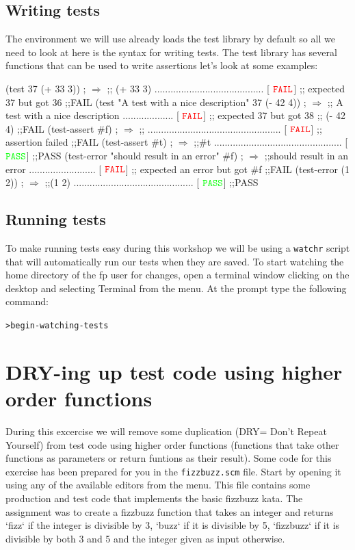 \documentclass[12pt,a4paper,english,twoside]{article}
\begin{document}
\subsection{Writing tests}
The environment we will use already loads the test library by default so all 
we need to look at here is the syntax for writing tests. The test library 
has several functions that can be used to write assertions let's look at some 
examples:
\begin{schemecode}
(test 37  (+ 33 3)) ; $\Rightarrow$ 
;; (+ 33 3) ......................................... [ ${\color{red}\texttt{FAIL}}$]
;;    expected 37 but got 36
;;FAIL
(test "A test with a nice description" 37 (- 42 4)) ; $\Rightarrow$
;; A test with a nice description ................... [ ${\color{red}\texttt{FAIL}}$]
;;    expected 37 but got 38
;;    (- 42 4)
;;FAIL
(test-assert #f) ; $\Rightarrow$
;; .................................................. [ ${\color{red}\texttt{FAIL}}$]
;;    assertion failed
;;FAIL
(test-assert #t) ; $\Rightarrow$
;;#t ................................................ [ ${\color{green}\texttt{PASS}}$]
;;PASS
(test-error "should result in an error" #f) ; $\Rightarrow$
;;should result in an error ......................... [ ${\color{red}\texttt{FAIL}}$]
;;    expected an error but got #f
;;FAIL
(test-error (1 2)) ; $\Rightarrow$
;;(1 2) ............................................. [ ${\color{green}\texttt{PASS}}$]
;;PASS
\end{schemecode}
\subsection{Running tests}
To make running tests easy during this workshop we will be using a 
\texttt{watchr} script that will automatically run our tests when they are 
saved. To start watching the home directory of the fp user for changes, open a 
terminal window clicking on the desktop and selecting Terminal from the menu. 
At the prompt type the following command:
\begin{alltt}
> begin-watching-tests
\end{alltt}
\section{DRY-ing up test code using higher order functions}
During this excercise we will remove some duplication (DRY= Don't Repeat 
Yourself) from test code using higher order functions (functions that take 
other functions as parameters or return funtions as their result). Some code 
for this exercise has been prepared for you in the \texttt{fizzbuzz.scm} file. 
Start by opening it using any of the available editors from the menu. This 
file contains some production and test code that implements the basic fizzbuzz 
kata. The assignment was to create a fizzbuzz function that takes an integer 
and returns `fizz` if the integer is divisible by 3, `buzz` if it is divisible 
by 5, `fizzbuzz` if it is divisible by both 3 and 5 and the integer given as 
input otherwise.
\end{document}

